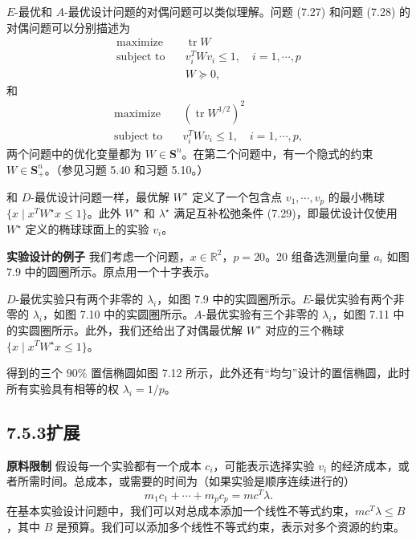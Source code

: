 \documentclass[UTF8, 12pt, fontset=fandol, oneside]{ctexart}
\begin{document}
$E$-最优和 $A$-最优设计问题的对偶问题可以类似理解。问题 (7.27) 和问题 (7.28) 的对偶问题可以分别描述为
\begin{equation}
\begin{aligned}
\text{maximize}\quad & \operatorname{tr}W\\
\text{subject to}\quad & v_i^TWv_i\leq 1,\quad i=1,\cdots,p\\
& W\succeq 0,
\end{aligned}
\tag{7.30}
\end{equation}
和
\begin{equation}
\begin{aligned}
\text{maximize}\quad & (\operatorname{tr}W^{1/2})^2\\
\text{subject to}\quad & v_i^TWv_i\leq 1,\quad i=1,\cdots,p,
\end{aligned}
\tag{7.31}
\end{equation}
两个问题中的优化变量都为 $W\in\mathbf{S}^n$。在第二个问题中，有一个隐式的约束 $W\in\mathbf{S}_+^n$。（参见习题 5.40 和习题 5.10。）

和 $D$-最优设计问题一样，最优解 $W^\star$ 定义了一个包含点 $v_1,\cdots,v_p$ 的最小椭球 $\{x\mid x^TW^\star x\leq 1\}$。此外 $W^\star$ 和 $\lambda^\star$ 满足互补松弛条件 (7.29)，即最优设计仅使用 $W^\star$ 定义的椭球球面上的实验 $v_i$。

\noindent\textbf{实验设计的例子}\quad
我们考虑一个问题，$x\in\mathbb{R}^2$，$p=20$。20 组备选测量向量 $a_i$ 如图 7.9 中的圆圈所示。原点用一个十字表示。

$D$-最优实验只有两个非零的 $\lambda_i$，如图 7.9 中的实圆圈所示。$E$-最优实验有两个非零的 $\lambda_i$，如图 7.10 中的实圆圈所示。$A$-最优实验有三个非零的 $\lambda_i$，如图 7.11 中的实圆圈所示。此外，我们还给出了对偶最优解 $W^\star$ 对应的三个椭球 $\{x\mid x^TW^\star x\leq 1\}$。

得到的三个 $90\%$ 置信椭圆如图 7.12 所示，此外还有“均匀”设计的置信椭圆，此时所有实验具有相等的权 $\lambda_i=1/p$。

\subsection*{7.5.3\quad 扩展}

\noindent\textbf{原料限制}\quad
假设每一个实验都有一个成本 $c_i$，可能表示选择实验 $v_i$ 的经济成本，或者所需时间。总成本，或需要的时间为（如果实验是顺序连续进行的）
\[
m_1c_1+\cdots+m_pc_p=mc^T\lambda.
\]
在基本实验设计问题中，我们可以对总成本添加一个线性不等式约束，$mc^T\lambda\leq B$，其中 $B$ 是预算。我们可以添加多个线性不等式约束，表示对多个资源的约束。
\end{document}
